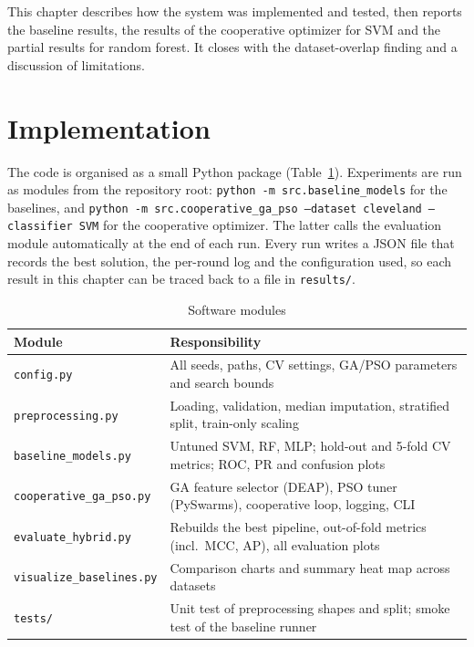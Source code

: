 \documentclass[MTech]{ugthesis}
\begin{document}
This chapter describes how the system was implemented and tested, then reports the baseline results, the results of the cooperative optimizer for SVM and the partial results for random forest. It closes with the dataset-overlap finding and a discussion of limitations.

\section{Implementation}
The code is organised as a small Python package (Table~\ref{tab:modules}). Experiments are run as modules from the repository root: \texttt{python -m src.baseline\_models} for the baselines, and \texttt{python -m src.cooperative\_ga\_pso --dataset cleveland --classifier SVM} for the cooperative optimizer. The latter calls the evaluation module automatically at the end of each run. Every run writes a JSON file that records the best solution, the per-round log and the configuration used, so each result in this chapter can be traced back to a file in \texttt{results/}.

\begin{table}[htpb]
\small
\renewcommand{\arraystretch}{1.25}
\caption{Software modules}
\label{tab:modules}
\begin{tabular}{|p{4.2cm}|p{9.5cm}|}
\hline
\textbf{Module} & \textbf{Responsibility} \\ \hline
\texttt{config.py} & All seeds, paths, CV settings, GA/PSO parameters and search bounds \\ \hline
\texttt{preprocessing.py} & Loading, validation, median imputation, stratified split, train-only scaling \\ \hline
\texttt{baseline\_models.py} & Untuned SVM, RF, MLP; hold-out and 5-fold CV metrics; ROC, PR and confusion plots \\ \hline
\texttt{cooperative\_ga\_pso.py} & GA feature selector (DEAP), PSO tuner (PySwarms), cooperative loop, logging, CLI \\ \hline
\texttt{evaluate\_hybrid.py} & Rebuilds the best pipeline, out-of-fold metrics (incl.\ MCC, AP), all evaluation plots \\ \hline
\texttt{visualize\_baselines.py} & Comparison charts and summary heat map across datasets \\ \hline
\texttt{tests/} & Unit test of preprocessing shapes and split; smoke test of the baseline runner \\ \hline
\end{tabular}
\end{table}
\end{document}
